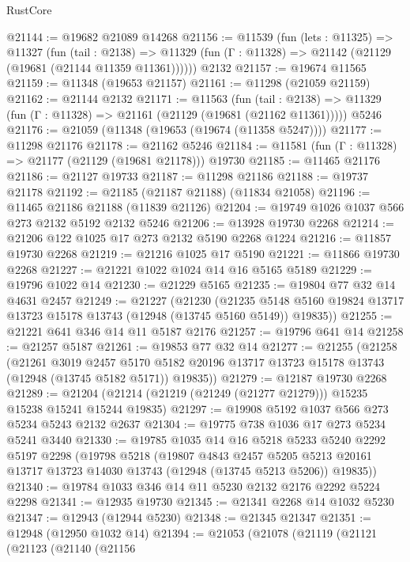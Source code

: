 \begin{lexlean}{RustCore}
\begin{coremodule}
@21144 := @19682 @21089 @14268
@21156 := @11539
    (fun (lets : @11325) =>
    @11327
      (fun (tail : @2138) =>
      @11329 (fun (Γ : @11328) => @21142 (@21129 (@19681 (@21144 @11359 @11361))))))
    @2132
@21157 := @19674 @11565
@21159 := @11348 (@19653 @21157)
@21161 := @11298 (@21059 @21159)
@21162 := @21144 @2132
@21171 := @11563
    (fun (tail : @2138) => @11329 (fun (Γ : @11328) => @21161 (@21129 (@19681 (@21162 @11361)))))
    @5246
@21176 := @21059 (@11348 (@19653 (@19674 (@11358 @5247))))
@21177 := @11298 @21176
@21178 := @21162 @5246
@21184 := @11581 (fun (Γ : @11328) => @21177 (@21129 (@19681 @21178))) @19730
@21185 := @11465 @21176
@21186 := @21127 @19733
@21187 := @11298 @21186
@21188 := @19737 @21178
@21192 := @21185 (@21187 @21188) (@11834 @21058)
@21196 := @11465 @21186 @21188 (@11839 @21126)
@21204 := @19749 @1026 @1037 @566 @273 @2132 @5192 @2132 @5246
@21206 := @13928 @19730 @2268
@21214 := @21206 @122 @1025 @17 @273 @2132 @5190 @2268 @1224
@21216 := @11857 @19730 @2268
@21219 := @21216 @1025 @17 @5190
@21221 := @11866 @19730 @2268
@21227 := @21221 @1022 @1024 @14 @16 @5165 @5189
@21229 := @19796 @1022 @14
@21230 := @21229 @5165
@21235 := @19804 @77 @32 @14 @4631 @2457
@21249 := @21227
    (@21230
      (@21235 @5148 @5160 @19824 @13717 @13723 @15178 @13743 (@12948 (@13745 @5160 @5149)) @19835))
@21255 := @21221 @641 @346 @14 @11 @5187 @2176
@21257 := @19796 @641 @14
@21258 := @21257 @5187
@21261 := @19853 @77 @32 @14
@21277 := @21255
    (@21258
      (@21261
        @3019
        @2457
        @5170
        @5182
        @20196
        @13717
        @13723
        @15178
        @13743
        (@12948 (@13745 @5182 @5171))
        @19835))
@21279 := @12187 @19730 @2268
@21289 := @21204 (@21214 (@21219 (@21249 (@21277 @21279))) @15235 @15238 @15241 @15244 @19835)
@21297 := @19908 @5192 @1037 @566 @273 @5234 @5243 @2132 @2637
@21304 := @19775 @738 @1036 @17 @273 @5234 @5241 @3440
@21330 := @19785
    @1035
    @14
    @16
    @5218
    @5233
    @5240
    @2292
    @5197
    @2298
    (@19798
      @5218
      (@19807
        @4843
        @2457
        @5205
        @5213
        @20161
        @13717
        @13723
        @14030
        @13743
        (@12948 (@13745 @5213 @5206))
        @19835))
@21340 := @19784 @1033 @346 @14 @11 @5230 @2132 @2176 @2292 @5224 @2298
@21341 := @12935 @19730
@21345 := @21341 @2268 @14 @1032 @5230
@21347 := @12943 (@12944 @5230)
@21348 := @21345 @21347
@21351 := @12948 (@12950 @1032 @14)
@21394 := @21053
    (@21078
      (@21119
        (@21121
          (@21123
            (@21140
              (@21156

\end{coremodule}
\end{lexlean}
